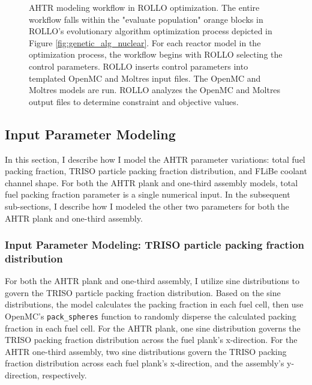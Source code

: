 \begin{figure}[htbp]
    \caption{\acrfull{AHTR} modeling workflow in \acrfull{ROLLO} optimization. The entire 
    workflow falls within the "evaluate population" orange blocks in ROLLO's evolutionary 
    algorithm optimization process depicted in Figure \ref{fig:genetic_alg_nuclear}. 
    For each reactor model in the optimization process, the workflow begins with ROLLO 
    selecting the control parameters. 
    ROLLO inserts control parameters into templated OpenMC and Moltres input files. 
    The OpenMC and Moltres models are run. 
    ROLLO analyzes the OpenMC and Moltres output files to determine constraint and 
    objective values.} 
    \label{fig:ahtr-model-flow}
\end{figure}

\subsection{Input Parameter Modeling}
\label{sec:input-parameter-modeling}
In this section, I describe how I model the \gls{AHTR} parameter variations: total fuel packing 
fraction, \gls{TRISO} particle packing fraction distribution, and \gls{FLiBe} coolant channel shape. 
For both the \gls{AHTR} plank and one-third assembly models, total fuel packing fraction parameter 
is a single numerical input.
In the subsequent sub-sections, I describe how I modeled the other two parameters for 
both the \gls{AHTR} plank and one-third assembly. 

\subsubsection{Input Parameter Modeling: TRISO particle packing fraction distribution}
For both the \gls{AHTR} plank and one-third assembly, I utilize sine distributions to govern the 
\gls{TRISO} particle packing fraction distribution. 
Based on the sine distributions, the model calculates the packing fraction in each fuel cell, then use 
OpenMC's \texttt{pack\_spheres} function to randomly disperse the calculated packing fraction in each 
fuel cell. 
For the \gls{AHTR} plank, one sine distribution governs the \gls{TRISO} packing fraction distribution 
across the fuel plank's x-direction. 
For the \gls{AHTR} one-third assembly, two sine distributions govern the \gls{TRISO} packing fraction 
distribution across each fuel plank's x-direction, and the assembly's y-direction, respectively. 

